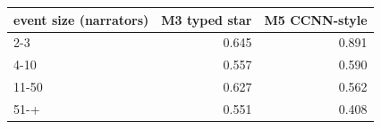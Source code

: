 \setlength{\tabcolsep}{3pt}
\begin{tabular}{lrr}
\toprule
event size (narrators) & M3 typed star & M5 CCNN-style \\
\midrule
2-3 & 0.645 & 0.891 \\
4-10 & 0.557 & 0.590 \\
11-50 & 0.627 & 0.562 \\
51-+ & 0.551 & 0.408 \\
\bottomrule
\end{tabular}